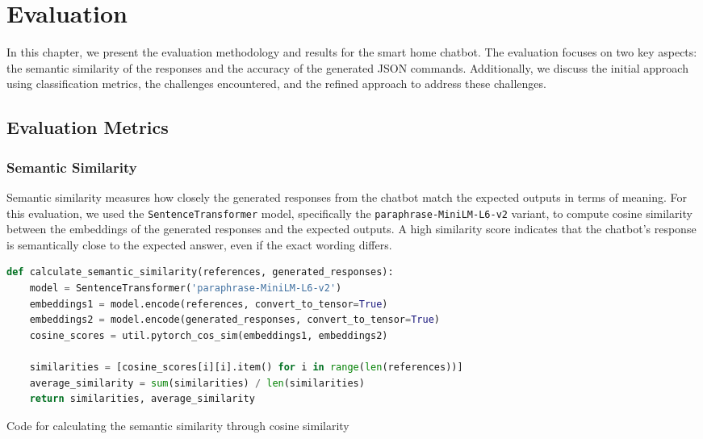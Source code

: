 
\chapter{Evaluation}
\label{chap:evaluation}

In this chapter, we present the evaluation methodology and results for the smart home chatbot. The evaluation focuses on two key aspects: the semantic similarity of the responses and the accuracy of the generated JSON commands. Additionally, we discuss the initial approach using classification metrics, the challenges encountered, and the refined approach to address these challenges.

\section{Evaluation Metrics}

\subsection{Semantic Similarity}

Semantic similarity measures how closely the generated responses from the chatbot match the expected outputs in terms of meaning. For this evaluation, we used the \texttt{SentenceTransformer} model, specifically the \texttt{paraphrase-MiniLM-L6-v2} variant, to compute cosine similarity between the embeddings of the generated responses and the expected outputs. A high similarity score indicates that the chatbot's response is semantically close to the expected answer, even if the exact wording differs.

\begin{Listing}
    \begin{lstlisting}[language=Python]
def calculate_semantic_similarity(references, generated_responses):
    model = SentenceTransformer('paraphrase-MiniLM-L6-v2')
    embeddings1 = model.encode(references, convert_to_tensor=True)
    embeddings2 = model.encode(generated_responses, convert_to_tensor=True)
    cosine_scores = util.pytorch_cos_sim(embeddings1, embeddings2)

    similarities = [cosine_scores[i][i].item() for i in range(len(references))]
    average_similarity = sum(similarities) / len(similarities)
    return similarities, average_similarity
  \end{lstlisting}
    \caption{Code for calculating the semantic similarity through cosine similarity}
    \label{lst:similarity}
\end{Listing}


